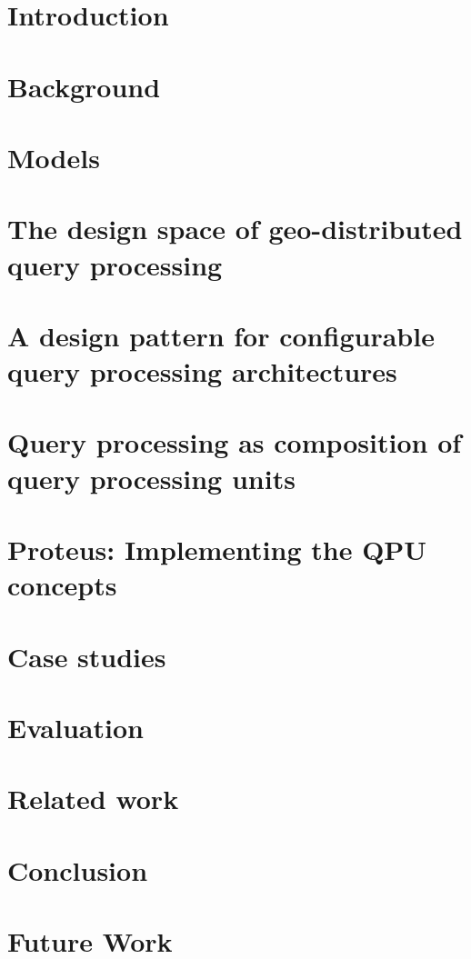 \chapter{Introduction}
\label{ch:intro}


\chapter{Background}
\label{ch:background}


\chapter{Models}
\label{ch:models}


\chapter{The design space of geo-distributed query processing}
\label{ch:design_space}


\chapter{A design pattern for configurable query processing architectures}
\label{ch:design_pattern}


\chapter{Query processing as composition of query processing units}
\label{ch:composition}


\chapter{Proteus: Implementing the QPU concepts}
\label{ch:proteus}


\chapter{Case studies}
\label{ch:case_studies}


\chapter{Evaluation}
\label{ch:evaluation}


\chapter{Related work}
\label{ch:related_work}


\chapter{Conclusion}
\label{ch:conclusion}


\chapter{Future Work}
\label{ch:future_work}

